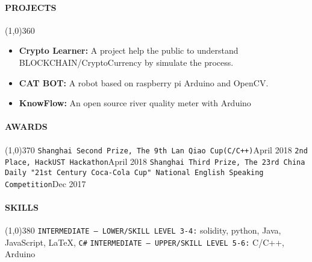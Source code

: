 \documentclass{article}
\begin{document}
\paragraph{PROJECTS}
\line(1,0){360}
\begin{itemize}
\item{\textbf{Crypto Learner:} A project help the public to understand BLOCKCHAIN/CryptoCurrency by simulate the process.
}
\item{\textbf{CAT BOT:} A robot based on raspberry pi Arduino and OpenCV.
}
\item{\textbf{KnowFlow:} An open source river quality meter with Arduino
}

\end{itemize}
\paragraph{AWARDS}
\line(1,0){370}
\newline
\texttt{Shanghai Second Prize, The 9th Lan Qiao Cup(C/C++)}\hfill{April 2018}
\newline
\texttt{2nd Place, HackUST Hackathon}\hfill{April 2018}
\newline
\texttt{Shanghai Third Prize, The 23rd China Daily "21st Century Coca-Cola Cup" National 
\newline English Speaking Competition}\hfill{Dec 2017}
\newline

\paragraph{SKILLS}
\line(1,0){380}
\newline
\texttt{INTERMEDIATE – LOWER/SKILL LEVEL 3-4:}
 solidity, python, Java, JavaScript, \LaTeX, \texttt{C\#}
 {}
 \newline
 \texttt{INTERMEDIATE – UPPER/SKILL LEVEL 5-6:}
 C/C++, Arduino{}
 
\end{document}

